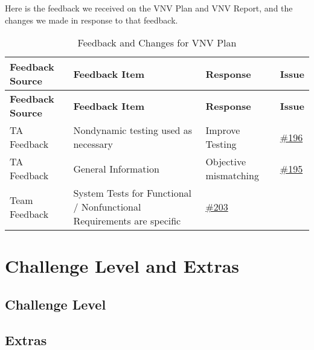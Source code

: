 \documentclass{article}
\begin{document}
Here is the feedback we received on the VNV Plan and VNV  Report, and the changes we made in response to that feedback.

\begin{longtable}{| p{} | p{} | p{} | p{} |}
    \caption{Feedback and Changes for VNV Plan} \\
    \hline
    \textbf{Feedback Source} & \textbf{Feedback Item} & \textbf{Response} & \textbf{Issue} \\
    \hline
    \endfirsthead
    \hline
    \textbf{Feedback Source} & \textbf{Feedback Item} & \textbf{Response} & \textbf{Issue} \\
    \hline
    \endhead
    \hline
    \endfoot
    TA Feedback & Nondynamic testing used as necessary & Improve Testing & \href{https://github.com/RezaJodeiri/CXR-Capstone/issues/196}{\#196} \\
    \hline
    TA Feedback & General Information & Objective mismatching & \href{https://github.com/RezaJodeiri/CXR-Capstone/issues/195}{\#195} \\
    \hline
    Team Feedback & System Tests for Functional / Nonfunctional Requirements are specific & \href{https://github.com/RezaJodeiri/CXR-Capstone/issues/203}{\#203}\\
    \hline

\end{longtable}

\section{Challenge Level and Extras}

\subsection{Challenge Level}


\subsection{Extras}

\end{document}
